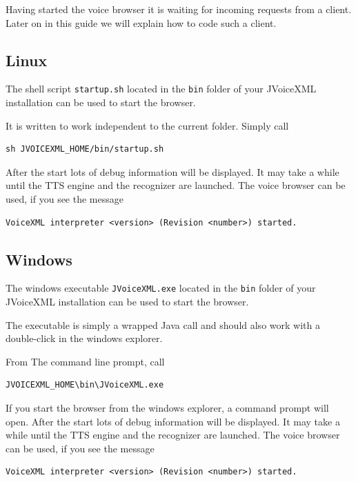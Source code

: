 \documentclass[11pt,a4paper]{article}
\begin{document}
Having started the voice browser it is waiting for incoming requests from a
client. Later on in this guide we will explain how to code such a client.

\subsection{Linux}

The shell script \texttt{startup.sh} located in the \texttt{bin} folder
of your JVoiceXML installation can be used to start the browser.

It is written to work independent to the current folder. Simply call

\begin{lstlisting}
sh JVOICEXML_HOME/bin/startup.sh
\end{lstlisting}

After the start lots of debug information will be displayed.
It may take a while until the TTS engine and the recognizer are launched.
The voice browser can be used, if you see the message

\begin{lstlisting}
VoiceXML interpreter <version> (Revision <number>) started.
\end{lstlisting}

\subsection{Windows}

The windows executable \texttt{JVoiceXML.exe} located in the \texttt{bin}
folder of your JVoiceXML installation can be used to start the browser.

The executable is simply a wrapped Java call and should also work with a
double-click in the windows explorer.

From The command line prompt, call

\begin{lstlisting}
JVOICEXML_HOME\bin\JVoiceXML.exe
\end{lstlisting}

If you start the browser from the windows explorer, a command prompt will open.
After the start lots of debug information will be displayed.
It may take a while until the TTS engine and the recognizer are launched.
The voice browser can be used, if you see the message

\begin{lstlisting}
VoiceXML interpreter <version> (Revision <number>) started.
\end{lstlisting}
\end{document}
